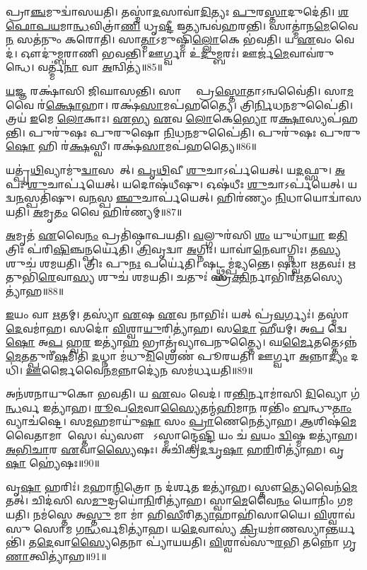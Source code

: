 𑌪𑍍𑌰𑌾\ul{𑌞𑍍𑌚}𑌮𑍁𑌦𑍍𑌵𑌾॑𑌸𑌯𑌤𑌿। 
𑌤𑌸𑍍𑌮𑌾॑\ul{𑌦}𑌸𑌾𑌵𑌾॑\ul{𑌦𑌿}𑌤𑍍𑌯𑌃 \ul{𑌪𑍁}𑌰\ul{𑌸𑍍𑌤𑌾}𑌦𑍁𑌦𑍇॑𑌤𑌿। 
\ul{𑌶}\ul{𑌫𑍋}\ul{𑌪}\ul{𑌯}\-𑌮𑌾\ul{𑌨𑍍𑌧}𑌵𑌿𑌤𑍍𑌰𑌾॑\ul{𑌣𑌿} 𑌧𑍃\ul{𑌷𑍍𑌟𑍀} 𑌇\ul{𑌤𑍍𑌯}𑌨𑍍𑌵𑌵॑𑌹𑌰𑌨𑍍𑌤𑌿। 
𑌸𑌾𑌤𑍍𑌮𑌾॑𑌨\ul{𑌮𑍇}𑌵𑍈\ul{𑌨}\ul{} 𑌸𑌤॑𑌨𑍁𑌂 𑌕𑌰𑍋𑌤𑌿। 
𑌸𑌾\ul{𑌤𑍍𑌮𑌾}𑌽𑌮𑍁𑌷𑍍𑌮𑌿𑌁॑\ul{𑌲𑍍𑌲𑍋}𑌕𑍇 𑌭॑𑌵𑌤𑌿। 
𑌯 \ul{𑌏}𑌵𑌂 𑌵𑍇𑌦॑। 
𑌔𑌦𑍁॑𑌮𑍍𑌬𑌰𑌾𑌣𑌿 𑌭𑌵𑌨𑍍𑌤𑌿। 
𑌊𑌰𑍍𑌗𑍍𑌵𑌾 𑌉॑\ul{𑌦𑍁}𑌮𑍍𑌬𑌰𑌃॑। 
𑌊𑌰𑍍𑌜॑\ul{𑌮𑍇}𑌵𑌾𑌵॑𑌰𑍁𑌨𑍍𑌧𑍇। 
𑌵𑌰𑍍𑌤𑍍𑌮॑\ul{𑌨𑌾} 𑌵𑌾 \ul{𑌅}𑌨𑍍𑌵𑌿𑌤𑍍𑌯॑॥85॥

\ul{𑌯}𑌜𑍍𑌞 𑌰𑌕𑍍𑌷𑌾॑𑌸𑌿 𑌜𑌿𑌘𑌾𑌸𑌨𑍍𑌤𑌿। 
𑌸𑌾𑌮𑍍𑌨𑌾᳚ 𑌪𑍍𑌰\ul{𑌸𑍍𑌤𑍋}𑌤𑌾𑌽𑌨𑍍𑌵𑌵𑍈॑𑌤𑌿। 
𑌸𑌾\ul{𑌮} 𑌵𑍈 𑌰॑\ul{𑌕𑍍𑌷𑍋}𑌹𑌾। 
𑌰𑌕𑍍𑌷॑\ul{𑌸𑌾}𑌮𑌪॑𑌹𑌤𑍍𑌯𑍈। 
𑌤𑍍𑌰𑌿\ul{𑌰𑍍𑌨𑌿}𑌧\ul{𑌨}𑌮𑍁𑌪𑍈॑𑌤𑌿। 
𑌤𑍍𑌰𑌯॑ \ul{𑌇}𑌮𑍇 \ul{𑌲𑍋}𑌕𑌾𑌃। 
\ul{𑌏}𑌭𑍍𑌯 \ul{𑌏}𑌵 \ul{𑌲𑍋}𑌕𑍇\ul{𑌭𑍍𑌯𑍋} 𑌰\ul{𑌕𑍍𑌷𑌾}\ul{}𑌸𑍍𑌯𑌪॑𑌹𑌨𑍍𑌤𑌿। 
𑌪𑍁𑌰𑍁॑𑌷𑌃 𑌪𑍁𑌰𑍁𑌷𑍋 \ul{𑌨𑌿}𑌧\ul{𑌨}𑌮𑍁𑌪𑍈॑𑌤𑌿। 
𑌪𑍁𑌰𑍁॑𑌷𑌃 𑌪𑍁𑌰𑍁\ul{𑌷𑍋} 𑌹𑌿 𑌰॑\ul{𑌕𑍍𑌷}𑌸𑍍𑌵𑍀। 
𑌰𑌕𑍍𑌷॑\ul{𑌸𑌾}𑌮𑌪॑𑌹𑌤𑍍𑌯𑍈॥86॥

𑌯𑌤𑍍𑌪𑍃॑\ul{𑌥𑌿}𑌵𑍍𑌯𑌾𑌮𑍁॑\ul{𑌦𑍍𑌵𑌾}𑌸𑌯𑍇᳚𑌤𑍍। 
\ul{𑌪𑍃}\ul{𑌥𑌿}𑌵𑍀 \ul{𑌶𑍁}𑌚𑌾𑌽𑌰𑍍𑌪॑𑌯𑍇𑌤𑍍। 
𑌯\ul{𑌦}𑌫𑍍𑌸𑍁। 
\ul{𑌅}𑌪𑌃  \ul{𑌶𑍁}𑌚𑌾𑌰𑍍𑌪॑𑌯𑍇𑌤𑍍। 
𑌯𑌦𑍋𑌷॑𑌧𑍀𑌷𑍁। 
𑌓𑌷॑𑌧𑍀𑌃  \ul{𑌶𑍁}𑌚𑌾𑌽𑌰𑍍𑌪॑𑌯𑍇𑌤𑍍। 
𑌯𑌦𑍍𑌵\ul{𑌨}𑌸𑍍𑌪𑌤𑌿॑𑌷𑍁। 
𑌵\ul{𑌨}𑌸𑍍𑌪𑌤𑍀᳚\ul{𑌞𑍍𑌛𑍁}𑌚𑌾𑌰𑍍𑌪॑𑌯𑍇𑌤𑍍। 
𑌹𑌿𑌰॑𑌣𑍍𑌯𑌂 \ul{𑌨𑌿}𑌧𑌾𑌯𑍋𑌦𑍍𑌵𑌾॑𑌸𑌯𑌤𑌿। 
\ul{𑌅}𑌮𑍃\ul{𑌤𑌂} 𑌵𑍈 𑌹𑌿𑌰॑𑌣𑍍𑌯𑌮𑍍॥87॥

\ul{𑌅}𑌮𑍃𑌤॑ \ul{𑌏}𑌵𑍈\ul{𑌨𑌂} 𑌪𑍍𑌰𑌤𑌿॑𑌷𑍍𑌠𑌾𑌪𑌯𑌤𑌿। 
\ul{𑌵}𑌲𑍍𑌗𑍁𑌰॑𑌸𑌿 \ul{𑌶𑌂} 𑌯𑍁𑌧𑌾॑\ul{𑌯𑌾} 𑌇\ul{𑌤𑌿} 𑌤𑍍𑌰𑌿𑌃 𑌪॑𑌰𑌿\ul{𑌷𑌿}𑌞𑍍𑌚𑌨𑍍𑌪𑌰𑍍𑌯𑍇॑𑌤𑌿। 
\ul{𑌤𑍍𑌰𑌿}𑌵𑍃𑌦𑍍𑌵𑌾 \ul{𑌅}𑌗𑍍𑌨𑌿𑌃। 
𑌯𑌾𑌵𑌾॑\ul{𑌨𑍇}𑌵𑌾𑌗𑍍𑌨𑌿𑌃। 
𑌤\ul{𑌸𑍍𑌯} 𑌶𑍁𑌚॑ 𑌶𑌮𑌯𑌤𑌿। 
𑌤𑍍𑌰𑌿𑌃 𑌪𑍁\ul{𑌨𑌃} 𑌪𑌰𑍍𑌯𑍇॑𑌤𑌿। 
𑌷𑌟𑍍𑌥𑍍𑌸𑌮𑍍𑌪॑𑌦𑍍𑌯𑌨𑍍𑌤𑍇। 
𑌷𑌡𑍍𑌵𑌾 \ul{𑌋}𑌤𑌵𑌃॑। 
\ul{𑌋}𑌤𑍁𑌭𑌿॑\ul{𑌰𑍇}𑌵𑌾\ul{𑌸𑍍𑌯} 𑌶𑍁𑌚॑ 𑌶𑌮𑌯𑌤𑌿। 
𑌚𑌤𑍁𑌃॑ 𑌸𑍍𑌰\ul{𑌕𑍍𑌤𑌿}𑌰𑍍𑌨𑌾𑌭𑌿॑𑌰𑍍\mbox{}\ul{𑌋}𑌤𑌸𑍍𑌯𑍇𑌤𑍍𑌯𑌾॑𑌹॥88॥

\ul{𑌇}𑌯𑌂 𑌵𑌾 \ul{𑌋}𑌤𑌮𑍍। 
𑌤𑌸𑍍𑌯𑌾॑ \ul{𑌏}𑌷 \ul{𑌏}𑌵 𑌨𑌾𑌭𑌿𑌃॑। 
𑌯𑌤𑍍 𑌪𑍍𑌰॑\ul{𑌵}𑌰𑍍𑌗𑍍𑌯𑌃॑। 
𑌤𑌸𑍍𑌮𑌾॑\ul{𑌦𑍇}𑌵𑌮𑌾॑𑌹। 
𑌸𑌦𑍋॑ \ul{𑌵𑌿}𑌶𑍍𑌵𑌾\ul{𑌯𑍁}𑌰𑌿𑌤𑍍𑌯𑌾॑𑌹। 
𑌸\ul{𑌦𑍋} 𑌹𑍀𑌯𑌮𑍍। 
𑌅\ul{𑌪} 𑌦𑍍𑌵𑍇\ul{𑌷𑍋} 𑌅\ul{𑌪} 𑌹𑍍𑌵\ul{𑌰} 𑌇𑌤𑍍𑌯𑌾॑\ul{𑌹} 𑌭𑍍𑌰𑌾𑌤𑍃॑𑌵𑍍𑌯𑌾𑌪𑌨𑍁𑌤𑍍𑌤𑍍𑌯𑍈। 
𑌘\ul{𑌰𑍍𑌮𑍈}𑌤𑌤𑍍𑌤𑍇𑌽𑌨𑍍𑌨॑\ul{𑌮𑍇}𑌤𑌤𑍍𑌪𑍁𑌰𑍀॑\ul{𑌷}𑌮𑌿𑌤𑌿॑ \ul{𑌦}𑌧𑍍𑌨𑌾 𑌮॑𑌧𑍁\ul{𑌮𑌿}𑌶𑍍𑌰𑍇𑌣॑ 𑌪𑍂𑌰𑌯𑌤𑌿। 
𑌊𑌰𑍍𑌗𑍍𑌵𑌾 \ul{𑌅}𑌨𑍍𑌨𑌾\ul{𑌦𑍍𑌯𑌂} 𑌦𑌧𑌿॑। 
\ul{𑌊}𑌰𑍍𑌜𑍈𑌵𑍈𑌨॑\ul{𑌮}𑌨𑍍𑌨𑌾𑌦𑍍𑌯𑍇॑\ul{𑌨} 𑌸𑌮॑𑌰𑍍𑌧𑌯𑌤𑌿॥89॥

𑌅𑌨॑𑌶𑌨𑌾𑌯𑍁𑌕𑍋 𑌭𑌵𑌤𑌿। 
𑌯 \ul{𑌏}𑌵𑌂 𑌵𑍇𑌦॑। 
𑌰\ul{𑌨𑍍𑌤𑌿}𑌰𑍍𑌨𑌾𑌮𑌾॑𑌸𑌿 \ul{𑌦𑌿}𑌵𑍍𑌯𑍋 𑌗॑\ul{𑌨𑍍𑌧}𑌰𑍍𑌵 𑌇𑌤𑍍𑌯𑌾॑𑌹। 
\ul{𑌰𑍂}𑌪\ul{𑌮𑍇}𑌵𑌾\ul{𑌸𑍍𑌯𑍈}𑌤𑌨𑍍𑌮॑\ul{𑌹𑌿}𑌮𑌾\ul{𑌨}\ul{} 𑌰𑌨𑍍𑌤𑌿𑌂॑ \ul{𑌬}𑌨𑍍𑌧𑍁\ul{𑌤𑌾𑌂} 𑌵𑍍𑌯𑌾𑌚॑𑌷𑍍𑌟𑍇। 
𑌸\ul{𑌮}𑌹𑌮𑌾𑌯𑍁॑\ul{𑌷𑌾} 𑌸𑌂 \ul{𑌪𑍍𑌰𑌾}𑌣𑍇𑌨𑍇𑌤𑍍𑌯𑌾॑𑌹। 
\ul{𑌆}𑌶𑌿𑌷॑\ul{𑌮𑍇}𑌵𑍈𑌤𑌾𑌮𑌾𑌶𑌾᳚𑌸𑍍𑌤𑍇। 
𑌵𑍍𑌯॑𑌸𑍗 𑌯𑍋᳚𑌽𑌸𑍍𑌮𑌾𑌨𑍍𑌦𑍍𑌵𑍇\ul{𑌷𑍍𑌟𑌿} 𑌯𑌂 𑌚॑ \ul{𑌵}𑌯𑌂 \ul{𑌦𑍍𑌵𑌿}𑌷𑍍𑌮 𑌇𑌤𑍍𑌯𑌾॑𑌹। 
\ul{𑌅}\ul{𑌭𑌿}\ul{𑌚𑌾}𑌰 \ul{𑌏}𑌵𑌾\ul{𑌸𑍍𑌯𑍈}𑌷𑌃। 
𑌅𑌚𑌿॑𑌕𑍍𑌰\ul{𑌦}𑌦𑍍𑌵𑍃\ul{𑌷𑌾} 𑌹\ul{𑌰𑌿}𑌰𑌿𑌤𑍍𑌯𑌾॑𑌹। 
𑌵𑍃\ul{𑌷𑌾} 𑌹𑍍𑌯𑍇॑𑌷𑌃॥90॥

𑌵𑍃\ul{𑌷𑌾} 𑌹𑌰𑌿𑌃॑। 
\ul{𑌮}𑌹𑌾\ul{𑌨𑍍𑌮𑌿}𑌤𑍍𑌰𑍋 𑌨 𑌦॑𑌰𑍍\mbox{}\ul{𑌶}𑌤 𑌇𑌤𑍍𑌯𑌾॑𑌹। 
𑌸𑍍𑌤𑍗\ul{𑌤𑍍𑌯𑍇}𑌵𑍈𑌨॑\ul{𑌮𑍇}𑌤𑌤𑍍। 
𑌚𑌿𑌦॑𑌸𑌿 𑌸\ul{𑌮𑍁}𑌦𑍍𑌰𑌯𑍋॑\ul{𑌨𑌿}𑌰𑌿𑌤𑍍𑌯𑌾॑𑌹। 
𑌸𑍍𑌵𑌾\ul{𑌮𑍇}𑌵𑍈\ul{𑌨𑌂} 𑌯𑍋𑌨𑌿𑌂॑ 𑌗𑌮𑌯𑌤𑌿। 
𑌨𑌮॑𑌸𑍍𑌤𑍇 𑌅\ul{𑌸𑍍𑌤𑍁} 𑌮𑌾 𑌮𑌾॑ 𑌹𑌿\ul{𑌸𑍀}𑌰𑌿\ul{𑌤𑍍𑌯𑌾}𑌹𑌾𑌹𑌿॑𑌸𑌾𑌯𑍈। 
\ul{𑌵𑌿}𑌶𑍍𑌵𑌾𑌵॑𑌸𑍁 𑌸𑍋𑌮 𑌗\ul{𑌨𑍍𑌧}𑌰𑍍𑌵𑌮𑌿𑌤𑍍𑌯𑌾॑𑌹। 
𑌯\ul{𑌦𑍇}𑌵𑌾𑌸𑍍𑌯॑ \ul{𑌕𑍍𑌰𑌿}𑌯𑌮𑌾॑𑌣𑌸𑍍𑌯𑌾\ul{𑌨𑍍𑌤}𑌰𑍍𑌯𑌨𑍍𑌤𑌿॑। 
𑌤\ul{𑌦𑍇}𑌵𑌾\ul{𑌸𑍍𑌯𑍈}𑌤𑍇𑌨𑌾 𑌪𑍍𑌯𑌾॑𑌯𑌯𑌤𑌿। 
\ul{𑌵𑌿}𑌶𑍍𑌵𑌾𑌵॑𑌸𑍁\ul{𑌰}𑌭𑌿 𑌤𑌨𑍍𑌨𑍋॑ 𑌗𑍃\ul{𑌣𑌾}𑌤𑍍𑌵𑌿\-𑌤𑍍𑌯𑌾॑𑌹॥91॥

